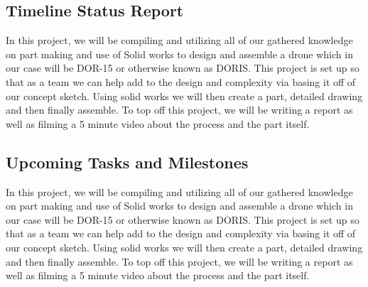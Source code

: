 
\subsection{Timeline Status Report}
In this project, we will be compiling and utilizing all of our gathered knowledge on part making and use of Solid works to design and assemble a drone which in our case will be DOR-15 or otherwise known as DORIS.  This project is set up so that as a team we can help add to the design and complexity via basing it off of our concept sketch.  Using solid works we will then create a part, detailed drawing and then finally assemble.  To top off this project, we will be writing a report as well as filming a 5 minute video about the process and the part itself.\par

\subsection{Upcoming Tasks and Milestones}
In this project, we will be compiling and utilizing all of our gathered knowledge on part making and use of Solid works to design and assemble a drone which in our case will be DOR-15 or otherwise known as DORIS.  This project is set up so that as a team we can help add to the design and complexity via basing it off of our concept sketch.  Using solid works we will then create a part, detailed drawing and then finally assemble.  To top off this project, we will be writing a report as well as filming a 5 minute video about the process and the part itself.\par


